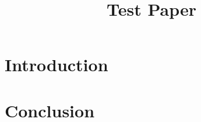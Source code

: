\documentclass[10pt, sigconf, natbib, sort&compress, screen, letterpage]{acmart}
\begin{document}
\title{Test Paper}
\author{}



\maketitle

\section{Introduction}
\label{sec:intro}

\section{Conclusion}




\end{document}
